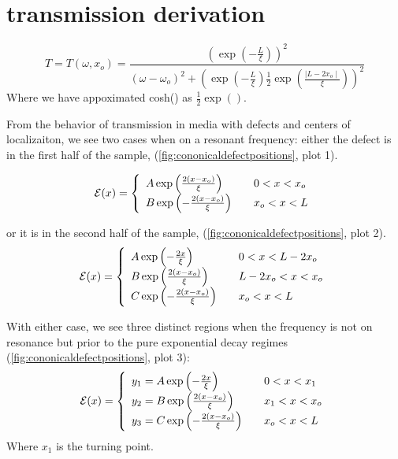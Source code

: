 \section{transmission derivation}

\begin{equation}
T = T(\omega, x_o) = \frac{(\exp(-\frac{L}{\xi}))^2}{ 
(\omega-\omega _o)^2 + (\exp(-\frac{L}{\xi})\frac{1}{2}\exp(\frac{\mid L-2 x_o \mid}{\xi}))^2 }
\label{fig:appendixtransmission}
\end{equation}
Where we have appoximated cosh() as $\frac{1}{2}\exp()$. 

From the behavior of transmission in media with defects and centers of localizaiton, we see two cases when on a resonant frequency:  either the defect is in the first half of the sample, (\ref{fig:cononicaldefectpositions}, plot 1).

\begin{equation}
{\cal E}(x) = \left\{ 
\begin{array}{l l}
  A \exp\left(\frac{2 (x-x_o)}{\xi}\right) & \quad 0 < x < x_o \\
  B \exp\left(-\frac{2 (x-x_o)}{\xi}\right) & \quad x_o < x < L\\
\end{array} \right.
\label{fig:left}
\end{equation}

or it is in the second half of the sample, (\ref{fig:cononicaldefectpositions}, plot 2).
\begin{equation}
{\cal E}(x) = \left\{ 
\begin{array}{l l}
 A \exp\left(-\frac{2 x}{\xi}\right) & \quad 0 < x < L-2 x_o \\
 B \exp\left(\frac{2 (x-x_o)}{\xi}\right) & \quad L-2 x_o < x < x_o \\
 C \exp\left(-\frac{2 (x-x_o)}{\xi}\right) & \quad x_o < x < L \\
\end{array} \right.
\label{fig:right}
\end{equation}

With either case, we see three distinct regions when the frequency is not on resonance but prior to the pure exponential decay regimes (\ref{fig:cononicaldefectpositions}, plot 3):
\begin{equation}
{\cal E}(x) = \left\{ 
\begin{array}{l l}
y_1 = A \exp\left(-\frac{2 x}{\xi}\right)   & \quad 0 < x < x_1  \\
y_2 = B \exp\left(\frac{2 (x-x_o)}{\xi}\right) & \quad x_1 < x < x_o  \\
y_3 = C \exp\left(-\frac{2 (x-x_o)}{\xi}\right) & \quad  x_o < x < L \\
\end{array} \right.
\label{fig:startingequations}
\end{equation}
Where $x_1$ is the turning point.


